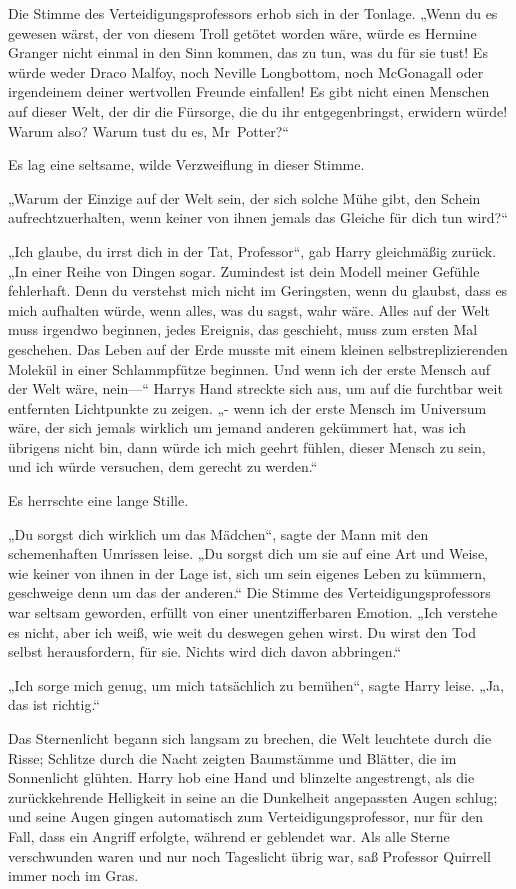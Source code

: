 {Die Stimme des Verteidigungsprofessors erhob sich in der Tonlage. „Wenn du es gewesen wärst, der von diesem Troll getötet worden wäre, würde es Hermine Granger nicht einmal in den Sinn kommen, das zu tun, was du für sie tust! Es würde weder Draco Malfoy, noch Neville Longbottom, noch McGonagall oder irgendeinem deiner wertvollen Freunde einfallen! Es gibt nicht einen Menschen auf dieser Welt, der dir die Fürsorge, die du ihr entgegenbringst, erwidern würde! Warum also? Warum tust du es, Mr~Potter?“

Es lag eine seltsame, wilde Verzweiflung in dieser Stimme.

„Warum der Einzige auf der Welt sein, der sich solche Mühe gibt, den Schein aufrechtzuerhalten, wenn keiner von ihnen jemals das Gleiche für dich tun wird?“

„Ich glaube, du irrst dich in der Tat, Professor“, gab Harry gleichmäßig zurück. „In einer Reihe von Dingen sogar. Zumindest ist dein Modell meiner Gefühle fehlerhaft. Denn du verstehst mich nicht im Geringsten, wenn du glaubst, dass es mich aufhalten würde, wenn alles, was du sagst, wahr wäre. Alles auf der Welt muss irgendwo beginnen, jedes Ereignis, das geschieht, muss zum ersten Mal geschehen. Das Leben auf der Erde musste mit einem kleinen selbstreplizierenden Molekül in einer Schlammpfütze beginnen. Und wenn ich der erste Mensch auf der Welt wäre, nein—“ Harrys Hand streckte sich aus, um auf die furchtbar weit entfernten Lichtpunkte zu zeigen. „- wenn ich der erste Mensch im Universum wäre, der sich jemals wirklich um jemand anderen gekümmert hat, was ich übrigens nicht bin, dann würde ich mich geehrt fühlen, dieser Mensch zu sein, und ich würde versuchen, dem gerecht zu werden.“

Es herrschte eine lange Stille.

„Du sorgst dich wirklich um das Mädchen“, sagte der Mann mit den schemenhaften Umrissen leise. „Du sorgst dich um sie auf eine Art und Weise, wie keiner von ihnen in der Lage ist, sich um sein eigenes Leben zu kümmern, geschweige denn um das der anderen.“ Die Stimme des Verteidigungsprofessors war seltsam geworden, erfüllt von einer unentzifferbaren Emotion. „Ich verstehe es nicht, aber ich weiß, wie weit du deswegen gehen wirst. Du wirst den Tod selbst herausfordern, für sie. Nichts wird dich davon abbringen.“

„Ich sorge mich genug, um mich tatsächlich zu bemühen“, sagte Harry leise. „Ja, das ist richtig.“

Das Sternenlicht begann sich langsam zu brechen, die Welt leuchtete durch die Risse; Schlitze durch die Nacht zeigten Baumstämme und Blätter, die im Sonnenlicht glühten. Harry hob eine Hand und blinzelte angestrengt, als die zurückkehrende Helligkeit in seine an die Dunkelheit angepassten Augen schlug; und seine Augen gingen automatisch zum Verteidigungsprofessor, nur für den Fall, dass ein Angriff erfolgte, während er geblendet war. Als alle Sterne verschwunden waren und nur noch Tageslicht übrig war, saß Professor Quirrell immer noch im Gras.

}
